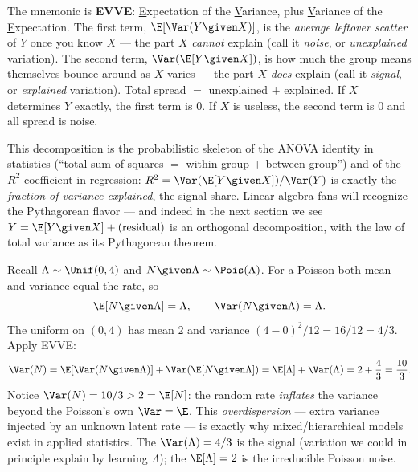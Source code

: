 \begin{intuitionbox}
The mnemonic is \textbf{EVVE}: \underline{E}xpectation of the \underline{V}ariance, plus
\underline{V}ariance of the \underline{E}xpectation. The first term, $\E[\Var(Y\given X)]$, is the
\emph{average leftover scatter} of $Y$ once you know $X$ --- the part $X$ \emph{cannot} explain (call it
\emph{noise}, or \emph{unexplained} variation). The second term, $\Var(\E[Y\given X])$, is how much the
group means themselves bounce around as $X$ varies --- the part $X$ \emph{does} explain (call it
\emph{signal}, or \emph{explained} variation). Total spread $=$ unexplained $+$ explained. If $X$
determines $Y$ exactly, the first term is $0$. If $X$ is useless, the second term is $0$ and all spread
is noise.
\end{intuitionbox}

\begin{connectionbox}
This decomposition is the probabilistic skeleton of the ANOVA identity in statistics
(``total sum of squares $=$ within-group $+$ between-group'') and of the $R^2$ coefficient in
regression: $R^2 = \Var(\E[Y\given X]) / \Var(Y)$ is exactly the \emph{fraction of variance explained},
the signal share. Linear algebra fans will recognize the Pythagorean flavor --- and indeed in the next
section we see $Y = \E[Y\given X] + (\text{residual})$ is an orthogonal decomposition, with the law of
total variance as its Pythagorean theorem.
\end{connectionbox}

\begin{example}
\label{ch15:ex-poisson-var}
Recall $\Lambda \sim \Unif(0,4)$ and $N \given \Lambda \sim \Pois(\Lambda)$. For a Poisson both mean and
variance equal the rate, so
\[
  \E[N\given\Lambda] = \Lambda, \qquad \Var(N\given\Lambda) = \Lambda.
\]
The uniform on $(0,4)$ has mean $2$ and variance $(4-0)^2/12 = 16/12 = 4/3$. Apply EVVE:
\[
  \Var(N) = \E[\Var(N\given\Lambda)] + \Var(\E[N\given\Lambda])
          = \E[\Lambda] + \Var(\Lambda) = 2 + \frac{4}{3} = \frac{10}{3}.
\]
Notice $\Var(N) = 10/3 > 2 = \E[N]$: the random rate \emph{inflates} the variance beyond the
Poisson's own $\Var = \E$. This \emph{overdispersion} --- extra variance injected by an unknown latent
rate --- is exactly why mixed/hierarchical models exist in applied statistics. The $\Var(\Lambda) = 4/3$
is the signal (variation we could in principle explain by learning $\Lambda$); the $\E[\Lambda] = 2$ is
the irreducible Poisson noise.
\end{example}

